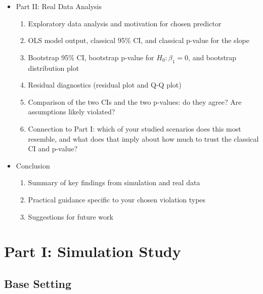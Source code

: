 \documentclass[12pt]{article}
\begin{document}
\begin{itemize}
    \item Part II: Real Data Analysis
    \begin{enumerate}
        \item Exploratory data analysis and motivation for chosen predictor
        \item OLS model output, classical 95\% CI, and classical p-value for the slope
        \item Bootstrap 95\% CI, bootstrap p-value for $H_0\colon \beta_1 = 0$, and bootstrap distribution plot
        \item Residual diagnostics (residual plot and Q-Q plot)
        \item Comparison of the two CIs and the two p-values: do they agree? Are assumptions likely violated?
        \item Connection to Part I: which of your studied scenarios does this most resemble, and what does that imply about how much to trust the classical CI and p-value?
    \end{enumerate}


    \item Conclusion
    \begin{enumerate}
        \item Summary of key findings from simulation and real data
        \item Practical guidance specific to your chosen violation types
        \item Suggestions for future work
    \end{enumerate}
\end{itemize}


\section*{Part I: Simulation Study}

\subsection*{Base Setting}
\end{document}
